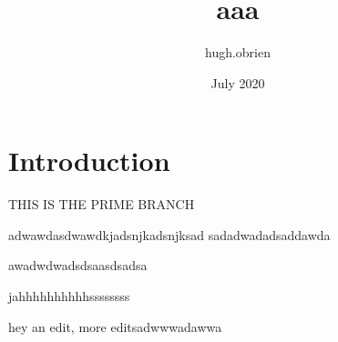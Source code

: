 \documentclass{article}
\title{aaa}
\author{hugh.obrien }
\date{July 2020}
\begin{document}
\maketitle

\section{Introduction}

THIS IS THE PRIME BRANCH

adwawdasdwawdkjadsnjkadsnjksad
sadadwadadsaddawda

awadwdwadsdsaasdsadsa

jahhhhhhhhhhssssssss

hey an edit, more editsadwwwadawwa
\end{document}
